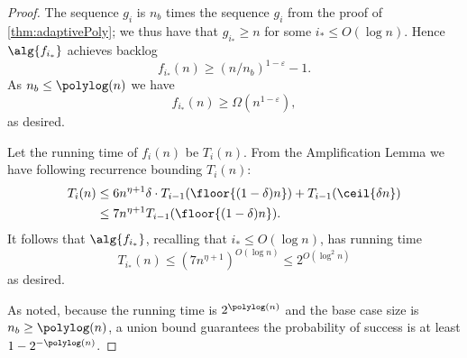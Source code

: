 \begin{proof}
  The sequence $g_i$ is $n_b$ times the sequence $g_i$ from
  the proof of \cref{thm:adaptivePoly}; we thus have that $g_{i_*}
  \ge n$ for some $i_* \le O(\log n)$.
  Hence $\alg{f_{i_*}}$ achieves backlog 
  $$f_{i_*}(n) \ge (n/n_b)^{1-\varepsilon}-1.$$
  As $n_b \le \polylog(n)$ we have
  $$f_{i_*}(n) \ge \Omega(n^{1-\varepsilon}),$$ as desired.

  Let the running time of $f_i(n)$ be $T_i(n)$. From the Amplification Lemma we have following recurrence bounding $T_i(n)$:
  \begin{align*}
    T_i(n) &\le 6n^{\eta+1} \delta \cdot T_{i-1}(\floor{(1-\delta)n}) +
  T_{i-1}(\ceil{\delta n}) \\
  &\le 7n^{\eta+1}T_{i-1}(\floor{(1-\delta)n}).
  \end{align*}
  It follows that $\alg{f_{i_*}}$, recalling that $i_* \le O(\log n)$, has running time
  $$T_{i_*}(n) \le (7n^{\eta+1})^{O(\log n)} \le 2^{O(\log^2 n)}$$
  as desired.

  As noted, because the running time is $2^{\polylog(n)}$ and the
  base case size is $n_b\ge \polylog(n)$, a union bound
  guarantees the probability of success is at least
  $1-2^{-\polylog(n)}$.
\end{proof}


